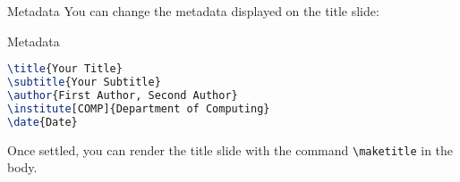 \documentclass[10pt,aspectratio=169]{beamer}
\begin{document}
\begin{frame}[fragile]{Metadata}
	You can change the metadata displayed on the title slide:

\begin{block}{Metadata}
\begin{lstlisting}[language=TeX]
\title{Your Title}
\subtitle{Your Subtitle}
\author{First Author, Second Author}
\institute[COMP]{Department of Computing}
\date{Date}
\end{lstlisting}
\end{block}

	Once settled, you can render the title slide with the command \verb|\maketitle| in the body.
\end{frame}


\backmatter %
\end{document}
